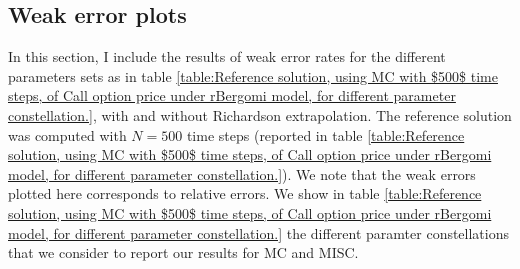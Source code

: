 \documentclass[11pt]{article}
\begin{document}
%



\subsection{Weak error plots} \label{sec:Weak error plots_no_change}
In this section, I include the results of weak error rates for the different parameters sets as in table \ref{table:Reference solution, using MC with $500$ time steps, of Call option price under rBergomi model, for different parameter constellation.}, with and without Richardson extrapolation. The reference solution was computed with $N=500$ time steps (reported in table \ref{table:Reference solution, using MC with $500$ time steps, of Call option price under rBergomi model, for different parameter constellation.}). We note that the weak errors plotted here corresponds to relative errors. We show in table \ref{table:Reference solution, using MC with $500$ time steps, of Call option price under rBergomi model, for different parameter constellation.} the different paramter constellations that we consider to report our results for MC and MISC.
\end{document}
